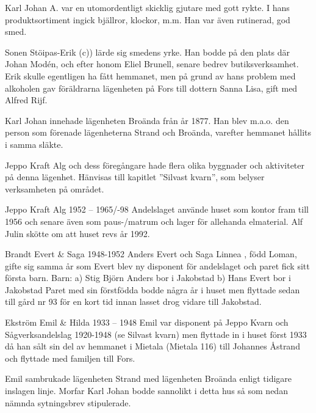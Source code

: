 Karl Johan A. var en utomordentligt skicklig gjutare med gott rykte. I hans produktsortiment ingick bjällror, klockor, m.m. Han var även rutinerad, god smed.

Sonen Stöipas-Erik (c)) lärde sig smedens yrke. Han bodde på den plats där Johan Modén, och efter honom Eliel Brunell, senare bedrev butiksverksamhet. Erik skulle egentligen ha fått hemmanet, men på grund av hans problem med alkoholen gav föräldrarna lägenheten på Fors till dottern Sanna Lisa, gift med Alfred Rijf.

Karl Johan innehade lägenheten Broända från år 1877. Han blev m.a.o. den person som förenade lägenheterna Strand och Broända, varefter hemmanet hållits i samma släkte.









Jeppo Kraft Alg och dess föregångare hade flera olika byggnader och aktiviteter på denna lägenhet. Hänvisas till kapitlet ”Silvast kvarn”, som belyser verksamheten på området.

Jeppo Kraft Alg
1952 – 1965/-98
Andelslaget använde huset som kontor fram till 1956 och senare även som paus-/matrum och lager för allehanda elmaterial. Alf Julin skötte om att huset revs år 1992.

Brandt Evert \& Saga
1948-1952
Anders Evert  och Saga Linnea , född Loman, gifte sig samma år som Evert blev ny disponent för andelslaget och paret fick sitt första barn.
Barn:
a) Stig Björn Anders  bor i Jakobstad
b) Hans Evert  bor i Jakobstad
Paret med sin förstfödda bodde några år i huset men flyttade sedan till gård nr 93 för en kort tid innan lasset drog vidare till Jakobstad.

Ekström
Emil \& Hilda 1933 – 1948
Emil var disponent på Jeppo Kvarn och Sågverksandelslag 1920-1948 (se Silvast kvarn) men flyttade in i huset först 1933 då han sålt sin del av hemmanet i Mietala (Mietala 116) till Johannes Åstrand och flyttade med familjen till Fors.


	Emil sambrukade lägenheten Strand med lägenheten Broända enligt tidigare inslagen linje. Morfar Karl Johan bodde sannolikt i detta hus så som nedan nämnda sytningsbrev stipulerade.



